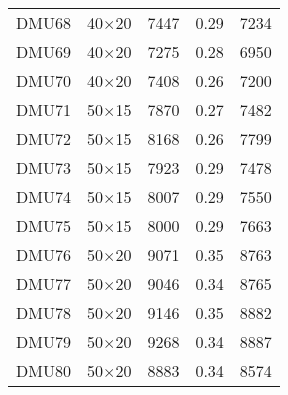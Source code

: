 \begin{table}[H]
\begin{tabular}{@{}ccccc@{}}
DMU68 & 40$\times$20 & 7447 & 0.29 & 7234\\ 
DMU69 & 40$\times$20 & 7275 & 0.28 & 6950\\ 
DMU70 & 40$\times$20 & 7408 & 0.26 & 7200\\ 
DMU71 & 50$\times$15 & 7870 & 0.27 & 7482\\ 
DMU72 & 50$\times$15 & 8168 & 0.26 & 7799\\ 
DMU73 & 50$\times$15 & 7923 & 0.29 & 7478\\ 
DMU74 & 50$\times$15 & 8007 & 0.29 & 7550\\ 
DMU75 & 50$\times$15 & 8000 & 0.29 & 7663\\ 
DMU76 & 50$\times$20 & 9071 & 0.35 & 8763\\ 
DMU77 & 50$\times$20 & 9046 & 0.34 & 8765\\ 
DMU78 & 50$\times$20 & 9146 & 0.35 & 8882\\ 
DMU79 & 50$\times$20 & 9268 & 0.34 & 8887\\ 
DMU80 & 50$\times$20 & 8883 & 0.34 & 8574\\ \bottomrule
\end{tabular}
\end{table}
